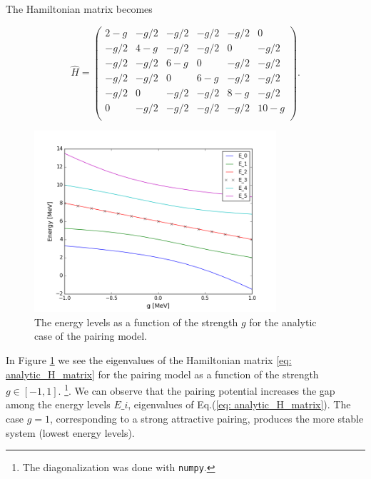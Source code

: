 \documentclass[twoside]{article}
\begin{document}
The Hamiltonian matrix becomes

\begin{equation}
\hat H = \begin{pmatrix}
2 - g & -g/2 & -g/2 & -g/2 & -g/2 & 0 \\
-g/2 & 4- g & -g/2 & -g/2 & 0 & -g/2 \\
-g/2 & -g/2 & 6 -g & 0 & -g/2 & -g/2 \\
-g/2 & -g/2 & 0 & 6 -g & -g/2 & -g/2 \\
-g/2 & 0 & -g/2 & -g/2 & 8 - g & -g/2 \\
0 & -g/2 & -g/2 & -g/2 & -g/2 & 10 - g \\
\end{pmatrix} .
\label{eq: analytic_H_matrix} 
\end{equation}

\begin{figure}[ht]
\centering
\includegraphics[width=0.8\textwidth]{eigval_vs_g.png}
\caption{The energy levels as a function of the strength $g$ for the analytic case of the pairing model. }
\label{fig: g_vs_eigval}
\end{figure}

In Figure \ref{fig: g_vs_eigval} we see the eigenvalues of the Hamiltonian matrix \eqref{eq: analytic_H_matrix} for the pairing model as a function of the strength $g \in [-1,1]$. \footnote{The diagonalization was done with \texttt{numpy}.}. We can observe that the pairing potential increases the gap among the energy levels $E\_i$, eigenvalues of Eq.(\ref{eq: analytic_H_matrix}). The case $g=1$, corresponding to a strong attractive pairing, produces the more stable system (lowest energy levels).

\newpage
\end{document}
